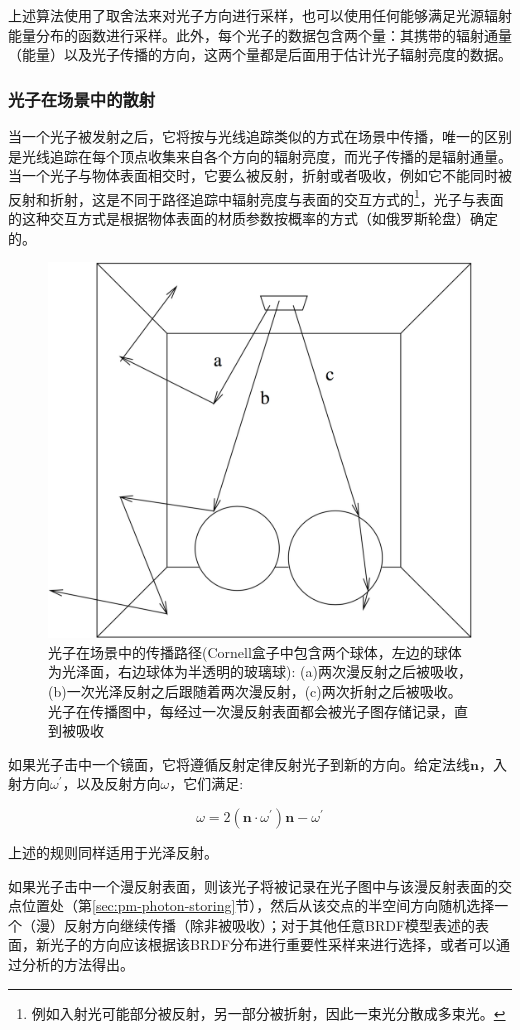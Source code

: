 上述算法使用了取舍法来对光子方向进行采样，也可以使用任何能够满足光源辐射能量分布的函数进行采样。此外，每个光子的数据包含两个量：其携带的辐射通量（能量）以及光子传播的方向，这两个量都是后面用于估计光子辐射亮度的数据。





\subsubsection{光子在场景中的散射}
当一个光子被发射之后，它将按与光线追踪类似的方式在场景中传播，唯一的区别是光线追踪在每个顶点收集来自各个方向的辐射亮度，而光子传播的是辐射通量。当一个光子与物体表面相交时，它要么被反射，折射或者吸收，例如它不能同时被反射和折射，这是不同于路径追踪中辐射亮度与表面的交互方式的\footnote{例如入射光可能部分被反射，另一部分被折射，因此一束光分散成多束光。}，光子与表面的这种交互方式是根据物体表面的材质参数按概率的方式（如俄罗斯轮盘）确定的。

\begin{figure}
\sidecaption
	\includegraphics[width=.5\textwidth]{figures/pm/pm-4}
	\caption{光子在场景中的传播路径(Cornell盒子中包含两个球体，左边的球体为光泽面，右边球体为半透明的玻璃球): (a)两次漫反射之后被吸收，(b)一次光泽反射之后跟随着两次漫反射，(c)两次折射之后被吸收。光子在传播图中，每经过一次漫反射表面都会被光子图存储记录，直到被吸收}
\end{figure}

如果光子击中一个镜面，它将遵循反射定律反射光子到新的方向。给定法线$\mathbf{n}$，入射方向${\omega}^{'}$，以及反射方向${\omega}$，它们满足:

\begin{equation}
	{\omega}=2(\mathbf{n}\cdot{\omega}^{'})\mathbf{n}-{\omega}^{'}
\end{equation}

\noindent 上述的规则同样适用于光泽反射。

如果光子击中一个漫反射表面，则该光子将被记录在光子图中与该漫反射表面的交点位置处（第\ref{sec:pm-photon-storing}节），然后从该交点的半空间方向随机选择一个（漫）反射方向继续传播（除非被吸收）；对于其他任意BRDF模型表述的表面，新光子的方向应该根据该BRDF分布进行重要性采样来进行选择，或者可以通过分析的方法得出。

